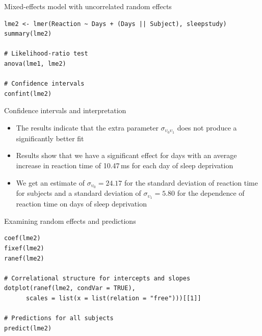 \documentclass[aspectratio=169]{beamer}
\begin{document}
{

\begin{frame}[fragile]{Mixed-effects model with uncorrelated random effects}
  \begin{lstlisting}
lme2 <- lmer(Reaction ~ Days + (Days || Subject), sleepstudy)
summary(lme2)

# Likelihood-ratio test
anova(lme1, lme2)

# Confidence intervals
confint(lme2)
  \end{lstlisting}
\end{frame}

}

\begin{frame}{Confidence intervals and interpretation}
  \begin{itemize}
    \item The results indicate that the extra parameter
      $\sigma_{\upsilon_0\upsilon_1}$ does not produce a significantly
      better fit
    \item Results show that we have a significant effect for days with an
  average increase in reaction time of 10.47\,ms for each day of sleep
  deprivation
    \item We get an estimate of $\sigma_{\upsilon_0} = 24.17$ for the
      standard deviation of reaction time for subjects and a standard
      deviation of $\sigma_{\upsilon_1} = 5.80$ for the dependence of
      reaction time on days of sleep deprivation
  \end{itemize}
\end{frame}

{

\begin{frame}[fragile]{Examining random effects and predictions}
      \begin{lstlisting}
coef(lme2)
fixef(lme2)
ranef(lme2)

# Correlational structure for intercepts and slopes
dotplot(ranef(lme2, condVar = TRUE),
      scales = list(x = list(relation = "free")))[[1]]

# Predictions for all subjects
predict(lme2)
      \end{lstlisting}
\end{frame}

}
\end{document}
